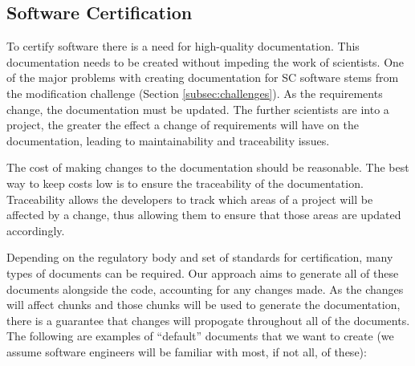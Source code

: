 \documentclass[10pt, preprint]{sigplanconf}
\begin{document}


\subsection{Software Certification} \label{subsec:software}

To certify software there is a need for high-quality
documentation. This documentation needs to be created without impeding the work
of scientists. One of the major problems with creating documentation for SC
software stems from the modification challenge (Section
\ref{subsec:challenges}). As the requirements change, the documentation must be
updated. The further scientists are into a project, the greater the effect a
change of requirements will have on the documentation, leading to
maintainability and traceability issues.

The cost of making changes to the documentation should be reasonable. The best
way to keep costs low is to ensure the traceability of the
documentation. Traceability allows the developers to track which areas of a
project will be affected by a change, thus allowing them to ensure that those
areas are updated accordingly.

Depending on the regulatory body and set of standards for certification, many
types of documents can be required. Our approach aims to generate all of these
documents alongside the code, accounting for any changes made. As the changes
will affect chunks and those chunks will be used to generate the documentation,
there is a guarantee that changes will propogate throughout all of the
documents. The following are examples of ``default'' documents that we want to
create (we assume software engineers will be familiar with most, if not all, of
these):
\end{document}

